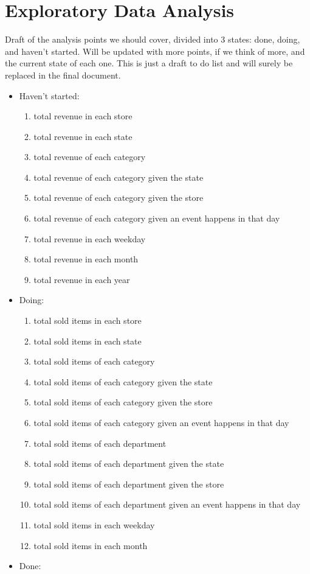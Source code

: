 \documentclass[11pt]{article}
\begin{document}
\section{Exploratory Data Analysis}
Draft of the analysis points we should cover, divided into 3 states: done, doing, and haven't started. Will be updated with more points, if we think of more, and the current state of each one. This is just a draft to do list and will surely be replaced in the final document.
\begin{itemize}
    \item Haven't started: \begin{enumerate}
        \item total revenue in each store
        \item total revenue in each state
        \item total revenue of each category
        \item total revenue of each category given the state
        \item total revenue of each category given the store
        \item total revenue of each category given an event happens in that day
        \item total revenue in each weekday
        \item total revenue in each month
        \item total revenue in each year
    \end{enumerate}
    \item Doing:  \begin{enumerate}
        \item total sold items in each store
        \item total sold items in each state
        \item total sold items of each category
        \item total sold items of each category given the state
        \item total sold items of each category given the store
        \item total sold items of each category given an event happens in that day
        \item total sold items of each department
        \item total sold items of each department given the state
        \item total sold items of each department given the store
        \item total sold items of each department given an event happens in that day
        \item total sold items in each weekday
        \item total sold items in each month
    \end{enumerate}
    \item Done:
\end{itemize}
\end{document}
